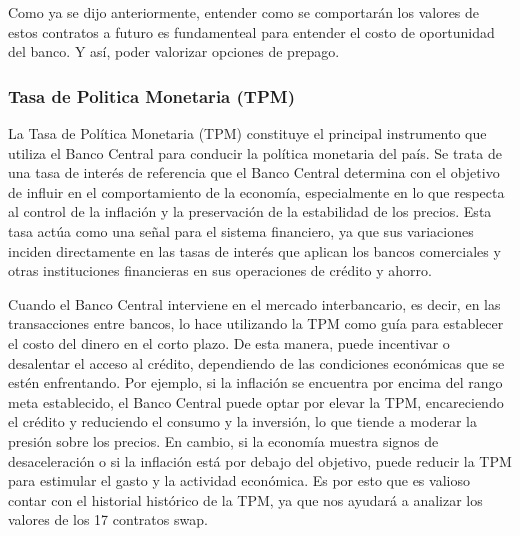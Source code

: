 
\qquad Como ya se dijo anteriormente, entender como se comportarán los valores de estos contratos a futuro es fundamenteal para entender el costo de oportunidad del banco. Y así, poder valorizar opciones de prepago.

\subsubsection{Tasa de Politica Monetaria (TPM)}

\qquad La Tasa de Política Monetaria (TPM) constituye el principal instrumento que utiliza el Banco Central para conducir la política monetaria del país. Se trata de una tasa de interés de referencia que el Banco Central determina con el objetivo de influir en el comportamiento de la economía, especialmente en lo que respecta al control de la inflación y la preservación de la estabilidad de los precios. Esta tasa actúa como una señal para el sistema financiero, ya que sus variaciones inciden directamente en las tasas de interés que aplican los bancos comerciales y otras instituciones financieras en sus operaciones de crédito y ahorro.

\qquad Cuando el Banco Central interviene en el mercado interbancario, es decir, en las transacciones entre bancos, lo hace utilizando la TPM como guía para establecer el costo del dinero en el corto plazo. De esta manera, puede incentivar o desalentar el acceso al crédito, dependiendo de las condiciones económicas que se estén enfrentando. Por ejemplo, si la inflación se encuentra por encima del rango meta establecido, el Banco Central puede optar por elevar la TPM, encareciendo el crédito y reduciendo el consumo y la inversión, lo que tiende a moderar la presión sobre los precios. En cambio, si la economía muestra signos de desaceleración o si la inflación está por debajo del objetivo, puede reducir la TPM para estimular el gasto y la actividad económica. Es por esto que es valioso contar con el historial histórico de la TPM, ya que nos ayudará a analizar los valores de los 17 contratos swap.

